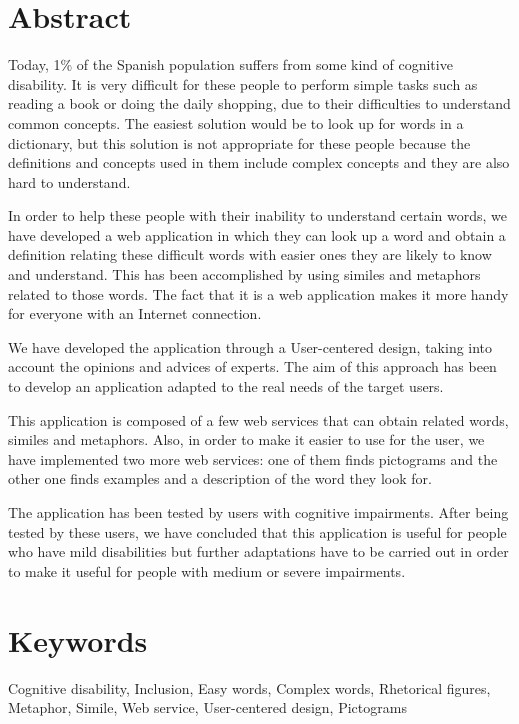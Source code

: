 \section*{Abstract}

Today, 1\% of the Spanish population suffers from some kind of cognitive disability. It is very difficult for these people to perform simple tasks such as reading a book or doing the daily shopping, due to their difficulties to understand common concepts. The easiest solution would be to look up for words in a dictionary, but this solution is not appropriate for these people because the definitions and concepts used in them include complex concepts and they are also hard to understand.

In order to help these people with their inability to understand certain words, we have developed a web application in which they can look up a word and obtain a definition relating these difficult words with easier ones they are likely to know and understand. This has been accomplished by using similes and metaphors related to those words. The fact that it is a web application makes it more handy for everyone with an Internet connection.

We have developed the application through a User-centered design, taking into account the opinions and advices of experts. The aim of this approach has been to develop an application adapted to the real needs of the target users.

This application is composed of a few web services that can obtain related words, similes and metaphors. Also, in order to  make it easier to use for the user, we have implemented two more web services: one of them finds pictograms and the other one finds examples and a description of the word they look for.

The application has been tested by users with cognitive impairments. After being tested by these users, we have concluded that this application is useful for people who have mild disabilities but further adaptations have to be carried out in order to make it useful for people with medium or severe impairments.


\section*{Keywords}

\noindent Cognitive disability, Inclusion, Easy words, Complex words, Rhetorical figures, Metaphor, Simile, Web service, User-centered design, Pictograms



